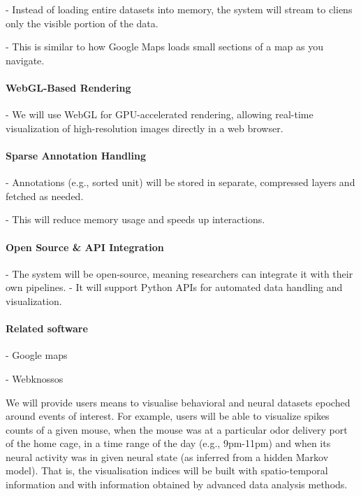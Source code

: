 - Instead of loading entire datasets into memory, the system will stream to
cliens only the visible portion of the data.

- This is similar to how Google Maps loads small sections of a map as you navigate.

\paragraph{WebGL-Based Rendering}

- We will use WebGL for GPU-accelerated rendering, allowing real-time visualization of high-resolution images directly in a web browser.

\paragraph{Sparse Annotation Handling}

- Annotations (e.g., sorted unit) will be stored in separate, compressed layers and fetched as needed.

- This will reduce memory usage and speeds up interactions.

\paragraph{Open Source \& API Integration}
- The system will be open-source, meaning researchers can integrate it with their own pipelines.
- It will support Python APIs for automated data handling and visualization.

\paragraph{Related software}

- Google maps

- Webknossos

\label{sec:intelligentlyEpochedVis}

We will provide users means to visualise behavioral and neural datasets epoched
around events of interest. For example, users will be able to visualize spikes
counts of a given mouse, when the mouse was at a particular odor delivery port
of the home cage, in a time range of the day (e.g., 9pm-11pm) and when its
neural activity was in given neural state (as inferred from a hidden Markov
model). That is, the visualisation indices will be built with spatio-temporal
information and with information obtained by advanced data analysis methods.

